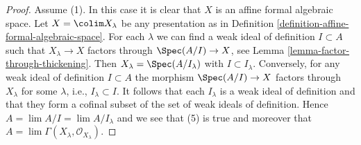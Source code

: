 \begin{proof}
\medskip\noindent
Assume (1). In this case it is clear that $X$ is an affine formal
algebraic space. Let $X = \colim X_\lambda$ be any presentation as in
Definition \ref{definition-affine-formal-algebraic-space}.
For each $\lambda$ we can find a weak ideal of definition
$I \subset A$ such that $X_\lambda \to X$ factors through
$\Spec(A/I) \to X$, see Lemma \ref{lemma-factor-through-thickening}.
Then $X_\lambda = \Spec(A/I_\lambda)$ with $I \subset I_\lambda$.
Conversely, for any weak ideal of definition $I \subset A$
the morphism $\Spec(A/I) \to X$ factors through $X_\lambda$
for some $\lambda$, i.e., $I_\lambda \subset I$.
It follows that each $I_\lambda$ is a weak ideal of definition
and that they form a cofinal subset of the set of weak ideals
of definition. Hence $A = \lim A/I = \lim A/I_\lambda$
and we see that (5) is true and moreover that
$A = \lim \Gamma(X_\lambda, \mathcal{O}_{X_\lambda})$.
\end{proof}